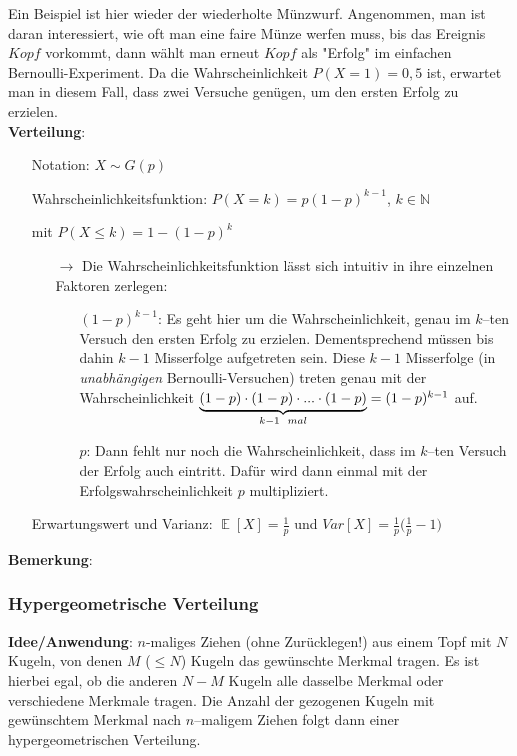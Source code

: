 \documentclass[a4paper]{article}
\DeclareMathOperator*{\E}{\mathbb{E}}
\begin{document}
\noindent Ein Beispiel ist hier wieder der wiederholte Münzwurf. Angenommen, man ist daran interessiert, wie oft man eine faire Münze werfen muss, bis das Ereignis $Kopf$ vorkommt, dann wählt man erneut $Kopf$ als "Erfolg" im einfachen Bernoulli-Experiment. Da die Wahrscheinlichkeit $P(X=1)=0,5$ ist, erwartet man in diesem Fall, dass zwei Versuche genügen, um den ersten Erfolg zu erzielen. \\

\noindent \textbf{Verteilung}:
\begin{itemize}
\item[] Notation: $X\sim G(p)$
\item[] Wahrscheinlichkeitsfunktion: $P(X=k)=p(1-p)^{k-1}$, $k \in \mathbb{N}$
\item[] \hspace{4.5cm} mit $P(X \leq k)=1-(1-p)^k$
	\begin{itemize}
	\item[$\rightarrow$] Die Wahrscheinlichkeitsfunktion lässt sich intuitiv in ihre einzelnen Faktoren zerlegen:
		\begin{itemize}
		\item[] $(1-p)^{k-1}$: Es geht hier um die Wahrscheinlichkeit, genau im $k$--ten Versuch den ersten Erfolg zu erzielen. Dementsprechend müssen bis dahin $k-1$ Misserfolge aufgetreten sein. Diese $k-1$ Misserfolge (in \textit{unabhängigen} Bernoulli-Versuchen) treten genau mit der Wahrscheinlichkeit $\underbrace{(1-p)\cdot(1-p)\cdot ... \cdot (1-p)}_{k-1 \hspace{0.2cm} mal} = (1-p)^{k-1}$ auf.
		\item[] $p$: Dann fehlt nur noch die Wahrscheinlichkeit, dass im $k$--ten Versuch der Erfolg auch eintritt. Dafür wird dann einmal mit der Erfolgswahrscheinlichkeit $p$ multipliziert.
		\end{itemize}
	\end{itemize}
\item[] Erwartungswert und Varianz: $\E[X]=\frac{1}{p}$ und $Var[X]=\frac{1}{p}\Big(\frac{1}{p}-1\Big)$

\end{itemize}

\noindent \textbf{Bemerkung}: 

\subsubsection{Hypergeometrische Verteilung} \label{sec:hypergeo}

\noindent \textbf{Idee/Anwendung}: $n$-maliges Ziehen (ohne Zurücklegen!) aus einem Topf mit $N$ Kugeln, von denen $M$ ($ \leq N$) Kugeln das gewünschte Merkmal tragen. Es ist hierbei egal, ob die anderen $N-M$ Kugeln alle dasselbe Merkmal oder verschiedene Merkmale tragen. Die Anzahl der gezogenen Kugeln mit gewünschtem Merkmal nach $n$--maligem Ziehen folgt dann einer hypergeometrischen Verteilung. \\
\end{document}
